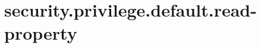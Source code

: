 \section{security.privilege.default.read-property}
\label{configuration:SecurityPrivilegeDefaultReadProperty}
\TODO
